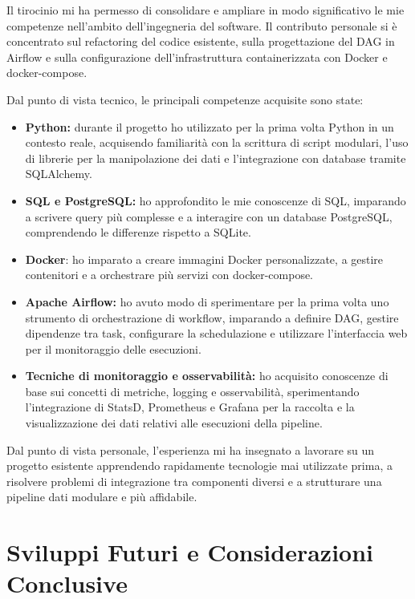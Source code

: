 Il tirocinio mi ha permesso di consolidare e ampliare in modo significativo le mie competenze 
nell’ambito dell’ingegneria del software. Il contributo personale si è concentrato sul refactoring 
del codice esistente, sulla progettazione del DAG in Airflow e sulla configurazione dell’infrastruttura 
containerizzata con Docker e docker-compose. 

Dal punto di vista tecnico, le principali competenze acquisite sono state:

\begin{itemize}
    \item \textbf{Python:} durante il progetto ho utilizzato per la prima volta Python in un contesto 
    reale, acquisendo familiarità con la scrittura di script modulari, l’uso di librerie per la manipolazione 
    dei dati e l’integrazione con database tramite SQLAlchemy.
    \item \textbf{SQL e PostgreSQL:} ho approfondito le mie conoscenze di SQL, imparando a scrivere query 
    più complesse e a interagire con un database PostgreSQL, comprendendo le differenze rispetto a SQLite.
    \item \textbf{Docker}: ho imparato a creare immagini Docker personalizzate, a gestire contenitori 
    e a orchestrare più servizi con docker-compose.
    \item \textbf{Apache Airflow:} ho avuto modo di sperimentare per la prima volta uno strumento 
    di orchestrazione di workflow, imparando a definire DAG, gestire dipendenze tra task, 
    configurare la schedulazione e utilizzare l’interfaccia web per il monitoraggio delle esecuzioni.
    \item \textbf{Tecniche di monitoraggio e osservabilità:} ho acquisito conoscenze di base sui concetti 
    di metriche, logging e osservabilità, sperimentando l’integrazione di StatsD, Prometheus e Grafana 
    per la raccolta e la visualizzazione dei dati relativi alle esecuzioni della pipeline.
\end{itemize}

Dal punto di vista personale, l’esperienza mi ha insegnato a lavorare su un progetto esistente 
apprendendo rapidamente tecnologie mai utilizzate prima, a risolvere problemi di integrazione tra 
componenti diversi e a strutturare una pipeline dati modulare e più affidabile. 

\section{Sviluppi Futuri e Considerazioni Conclusive}
\label{sec:sviluppifuturiconsiderazioniconglusive}


